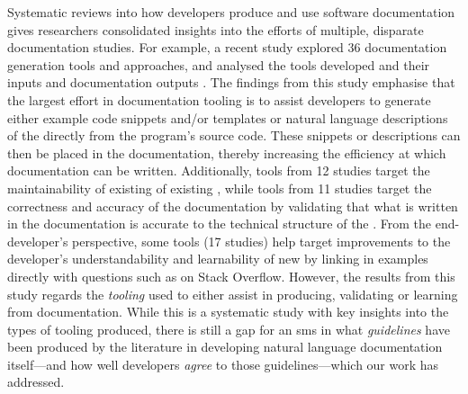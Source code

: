 Systematic reviews into how developers produce and use software documentation gives researchers consolidated insights into the efforts of multiple, disparate  documentation studies. For example, a recent \citeyear{Nybom:2018ef} study explored 36  documentation generation tools and approaches, and analysed the tools developed and their inputs and documentation outputs \citep{Nybom:2018ef}. The findings from this study emphasise that the largest effort in  documentation tooling is to assist developers to generate either example code snippets and/or templates or natural language descriptions of the  directly from the program's source code. These snippets or descriptions can then be placed in the  documentation, thereby increasing the efficiency at which  documentation can be written. Additionally, tools from 12 studies target the maintainability of existing  of existing , while tools from 11 studies target the correctness and accuracy of the documentation by validating that what is written in the documentation is accurate to the technical structure of the . From the end-developer's perspective, some tools (17 studies) help target improvements to the developer's understandability and learnability of new  by linking in examples directly with questions such as on Stack Overflow.
However, the results from this study regards the \textit{tooling} used to either assist in producing, validating or learning from  documentation. While this is a systematic study with key insights into the types of tooling produced, there is still a gap for an \gls{sms} in what \textit{guidelines} have been produced by the literature in developing natural language documentation itself---and how well developers \textit{agree} to those guidelines---which our work has addressed.

